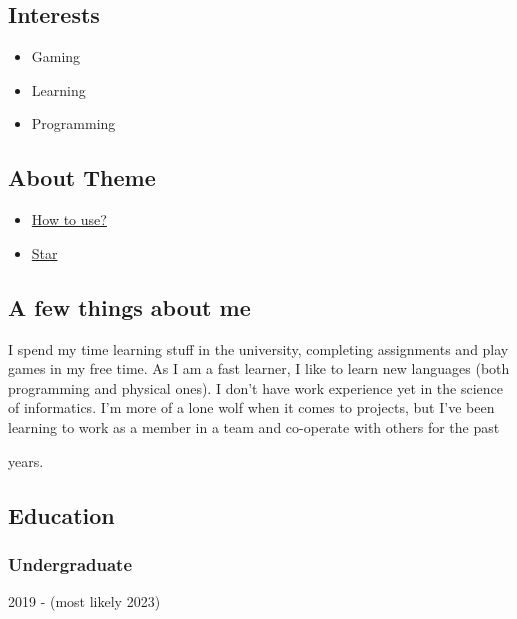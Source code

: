 \documentclass[]{article}
\providecommand{\tightlist}{%
  \setlength{\itemsep}{0pt}\setlength{\parskip}{0pt}}
\begin{document}
\subsection{Interests}\label{interests}

\begin{itemize}
\tightlist
\item
  Gaming
\item
  Learning
\item
  Programming
\end{itemize}

\subsection{About Theme}\label{about-theme}

\begin{itemize}
\tightlist
\item
  \href{https://www.youtube.com/watch?v=Jnmj1dXDbNk}{How to use?}
\item
  \href{https://github.com/sharu725/online-cv}{Star}
\end{itemize}

\subsection{\texorpdfstring{{ \emph{} \emph{} } A few things about
me}{    A few things about me}}\label{a-few-things-about-me}

I spend my time learning stuff in the university, completing assignments
and play games in my free time. As I am a fast learner, I like to learn
new languages (both programming and physical ones). I don't have work
experience yet in the science of informatics. I'm more of a lone wolf
when it comes to projects, but I've been learning to work as a member in
a team and co-operate with others for the past

years.

\subsection{\texorpdfstring{{ \emph{} \emph{} }
Education}{    Education}}\label{education}

\subsubsection{Undergraduate}\label{undergraduate}

2019 - (most likely 2023)
\end{document}
